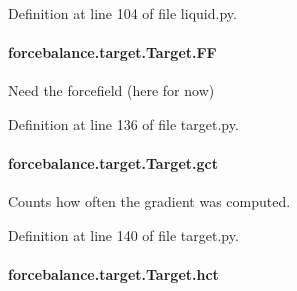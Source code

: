 Definition at line 104 of file liquid.\-py.

\hypertarget{classforcebalance_1_1target_1_1Target_a38a37919783141ea37fdcf8b00ce0aaf}{
\paragraph[{F\-F}]{\setlength{\rightskip}{0pt plus 5cm}forcebalance.\-target.\-Target.\-F\-F\hspace{0.3cm}{\ttfamily [inherited]}}}\label{classforcebalance_1_1target_1_1Target_a38a37919783141ea37fdcf8b00ce0aaf}


Need the forcefield (here for now) 



Definition at line 136 of file target.\-py.

\hypertarget{classforcebalance_1_1target_1_1Target_aa625ac88c6744eb14ef281d9496d0dbb}{
\paragraph[{gct}]{\setlength{\rightskip}{0pt plus 5cm}forcebalance.\-target.\-Target.\-gct\hspace{0.3cm}{\ttfamily [inherited]}}}\label{classforcebalance_1_1target_1_1Target_aa625ac88c6744eb14ef281d9496d0dbb}


Counts how often the gradient was computed. 



Definition at line 140 of file target.\-py.

\hypertarget{classforcebalance_1_1target_1_1Target_a5b5a42f78052b47f29ed4b940c6111a1}{
\paragraph[{hct}]{\setlength{\rightskip}{0pt plus 5cm}forcebalance.\-target.\-Target.\-hct\hspace{0.3cm}{\ttfamily [inherited]}}}\label{classforcebalance_1_1target_1_1Target_a5b5a42f78052b47f29ed4b940c6111a1}


